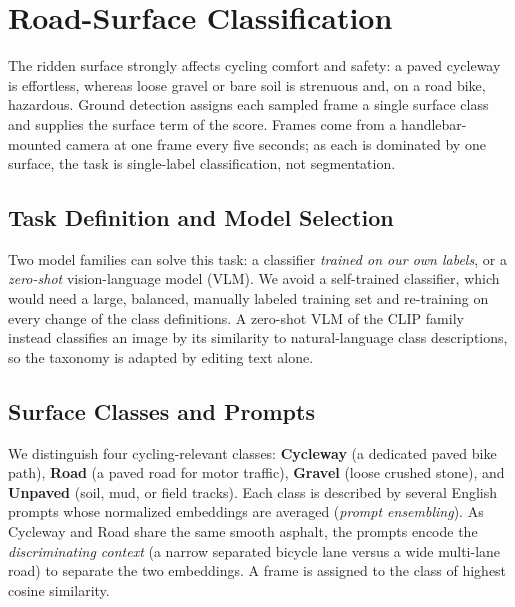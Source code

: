 \documentclass[letterpaper,journal]{IEEEtran}
\begin{document}

\clearpage
\section{Road-Surface Classification}

The ridden surface strongly affects cycling comfort and safety: a paved
cycleway is effortless, whereas loose gravel or bare soil is strenuous
and, on a road bike, hazardous. Ground detection assigns each sampled
frame a single surface class and supplies the surface term of the
score. Frames come from a handlebar-mounted camera at one frame every
five seconds; as each is dominated by one surface, the task is
single-label classification, not segmentation.

\subsection{Task Definition and Model Selection}
Two model families can solve this task: a classifier \emph{trained on
our own labels}, or a \emph{zero-shot} vision-language model (VLM). We
avoid a self-trained
classifier, which would need a large, balanced, manually labeled
training set and re-training on every change of the class definitions.
A zero-shot VLM of the CLIP family \cite{clip} instead classifies an
image by its similarity to natural-language class descriptions, so the
taxonomy is adapted by editing text alone.

\subsection{Surface Classes and Prompts}
We distinguish four cycling-relevant classes: \textbf{Cycleway} (a
dedicated paved bike path), \textbf{Road} (a paved road for motor
traffic), \textbf{Gravel} (loose crushed stone), and \textbf{Unpaved}
(soil, mud, or field tracks). Each class is described by several English
prompts whose normalized embeddings are averaged (\emph{prompt
ensembling}). As Cycleway and Road share the same smooth asphalt, the
prompts encode the \emph{discriminating context} (a narrow separated
bicycle lane versus a wide multi-lane road) to separate the two
embeddings. A frame is assigned to the class of highest cosine
similarity.
\end{document}
